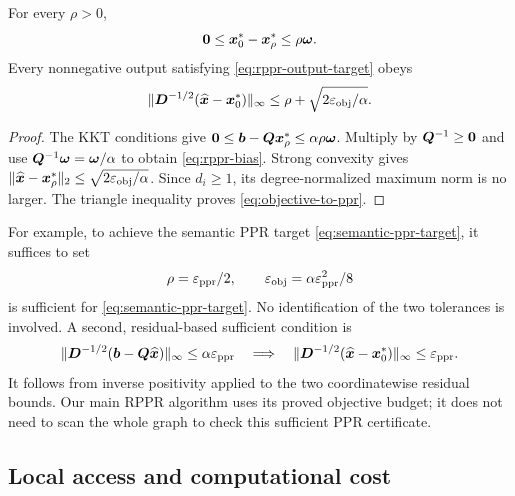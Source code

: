 \begin{proposition}
\label{prop:rppr-ppr-bridge}
For every $\rho>0$,
\begin{equation}
 \bm{0}\leq\bm{x}_0^*-\bm{x}_\rho^*\leq\rho\bm{\omega}.
 \label{eq:rppr-bias}
\end{equation}
Every nonnegative output satisfying \cref{eq:rppr-output-target} obeys
\begin{equation}
 \lVert\bm{D}^{-1/2}(\widehat{\bm{x}}-\bm{x}_0^*)\rVert_\infty
 \leq\rho+\sqrt{2\varepsilon_{\mathrm{obj}}/\alpha}.
 \label{eq:objective-to-ppr}
\end{equation}
\end{proposition}
\begin{proof}
The KKT conditions give
$\bm{0}\leq\bm{b}-\bm{Q}\bm{x}_\rho^*\leq\alpha\rho\bm{\omega}$.
Multiply by $\bm{Q}^{-1}\geq\bm{0}$ and use
$\bm{Q}^{-1}\bm{\omega}=\bm{\omega}/\alpha$ to obtain \cref{eq:rppr-bias}.
Strong convexity gives
$\lVert\widehat{\bm{x}}-\bm{x}_\rho^*\rVert_2\leq\sqrt{2\varepsilon_{\mathrm{obj}}/\alpha}$.
Since $d_i\geq1$, its degree-normalized maximum norm is no larger.
The triangle inequality proves \cref{eq:objective-to-ppr}.
\end{proof}
For example, to achieve the semantic PPR target \cref{eq:semantic-ppr-target}, it suffices to set
\begin{equation}
 \rho=\varepsilon_{\mathrm{ppr}}/2,\qquad \varepsilon_{\mathrm{obj}}=\alpha\varepsilon_{\mathrm{ppr}}^2/8
 \label{eq:direct-ppr-budgets}
\end{equation}
is sufficient for \cref{eq:semantic-ppr-target}. No identification of the
two tolerances is involved. A second, residual-based sufficient condition is
\begin{equation}
 \lVert\bm{D}^{-1/2}(\bm{b}-\bm{Q}\widehat{\bm{x}})\rVert_\infty\leq\alpha\varepsilon_{\mathrm{ppr}}
 \quad\Longrightarrow\quad
 \lVert\bm{D}^{-1/2}(\widehat{\bm{x}}-\bm{x}_0^*)\rVert_\infty\leq\varepsilon_{\mathrm{ppr}}.
 \label{eq:ppr-residual-certificate}
\end{equation}
It follows from inverse positivity applied to the two coordinatewise
residual bounds. Our main RPPR algorithm uses its proved objective budget;
it does not need to scan the whole graph to check this sufficient PPR
certificate.

\subsection{Local access and computational cost}

